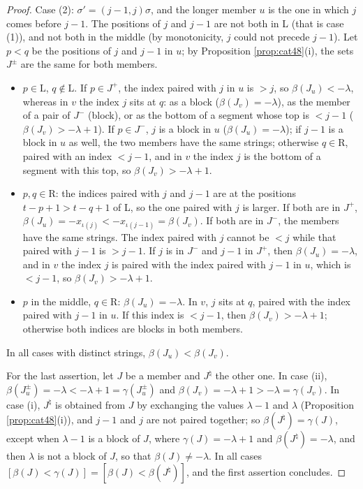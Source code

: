 \documentclass[a4paper,12pt,leqno]{amsart}
\theoremstyle{plain}
\theoremstyle{definition}
\begin{document}
\begin{proof}
Case (2): $\sigma'=(j-1,j)\sigma$, and the longer member $u$ is the one in which $j$ comes before
$j-1$. The positions of $j$ and $j-1$ are not both in L (that is case (1)), and not both in the middle
(by monotonicity, $j$ could not precede $j-1$). Let $p<q$ be the positions of $j$ and $j-1$ in $u$; by
Proposition \ref{prop:cat48}(i), the sets $J^\pm$ are the same for both members.
\begin{itemize}
\item $p\in\mathrm{L}$, $q\notin\mathrm{L}$. If $p\in J^+$, the index paired with $j$ in $u$ is $>j$, so
$\beta(J_u)<-\lambda$, whereas in $v$ the index $j$ sits at $q$: as a block ($\beta(J_v)=-\lambda$), as the
member of a pair of $J^-$ (block), or as the bottom of a segment whose top is $<j-1$
($\beta(J_v)>-\lambda+1$). If $p\in J^-$, $j$ is a block in $u$ ($\beta(J_u)=-\lambda$); if $j-1$ is a
block in $u$ as well, the two members have the same strings; otherwise $q\in\mathrm{R}$, paired with an index
$<j-1$, and in $v$ the index $j$ is the bottom of a segment with this top, so $\beta(J_v)>-\lambda+1$.
\item $p,q\in\mathrm{R}$: the indices paired with $j$ and $j-1$ are at the positions $t-p+1>t-q+1$ of L,
so the one paired with $j$ is larger. If both are in $J^+$, $\beta(J_u)=-x_{\iota(j)}<-x_{\iota(j-1)}=\beta(J_v)$. If both
are in $J^-$, the members have the same strings. The index paired with $j$ cannot be $<j$ while that paired with $j-1$
is $>j-1$. If $j$ is in $J^-$ and $j-1$ in $J^+$, then $\beta(J_u)=-\lambda$, and in $v$ the index $j$
is paired with the index paired with $j-1$ in $u$, which is $<j-1$, so $\beta(J_v)>-\lambda+1$.
\item $p$ in the middle, $q\in\mathrm{R}$: $\beta(J_u)=-\lambda$. In $v$, $j$ sits at $q$, paired with the
index paired with $j-1$ in $u$. If this index is $<j-1$, then $\beta(J_v)>-\lambda+1$; otherwise both indices are blocks
in both members.
\end{itemize}
In all cases with distinct strings, $\beta(J_u)<\beta(J_v)$.

For the last assertion, let $J$ be a member and $J^\natural$ the other one. In case (ii), $\beta(J_u^\pm)=-\lambda<
-\lambda+1=\gamma(J_u^\pm)$ and $\beta(J_v)=-\lambda+1>-\lambda=\gamma(J_v)$. In case (i), $J^\natural$ is obtained
from $J$ by exchanging the values $\lambda-1$ and $\lambda$ (Proposition \ref{prop:cat48}(i)), and $j-1$ and $j$
are not paired together; so $\beta(J^\natural)=\gamma(J)$, except when $\lambda-1$ is a block of $J$, where
$\gamma(J)=-\lambda+1$ and $\beta(J^\natural)=-\lambda$, and then $\lambda$ is not a block of $J$, so that
$\beta(J)\neq-\lambda$. In all cases $[\beta(J)<\gamma(J)]=[\beta(J)<\beta(J^\natural)]$, and the first
assertion concludes.
\end{proof}
\end{document}
